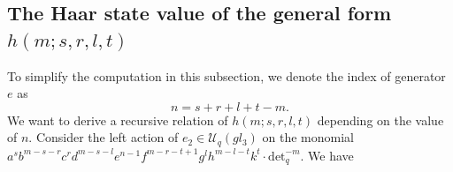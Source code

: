 \documentclass[table,a4paper,reqno]{amsart}
\numberwithin{equation}{section}
\theoremstyle{definition}
\begin{document}
\subsection{The Haar state value of the general form  $h(m;s,r,l,t)$}
To simplify the computation in this subsection, we denote the index of generator $e$ as
\begin{equation}
    n=s+r+l+t-m.
\end{equation}
We want to derive a recursive relation of $h(m;s,r,l,t)$ depending on the value of $n$. Consider the left action of $e_2\in\mathcal{U}_q(gl_3)$ on the monomial\\ $a^sb^{m-s-r}c^rd^{m-s-l}e^{n-1}f^{m-r-t+1}g^lh^{m-l-t}k^t\cdot\text{det}_q^{-m}$. We have
\end{document}
